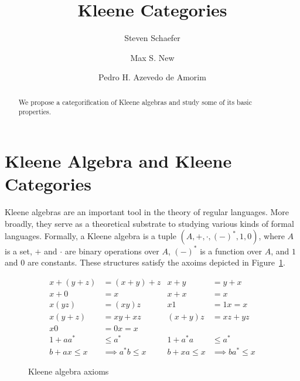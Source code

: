 \documentclass[acmsmall,anonymous,review,screen]{acmart}
\begin{document}
\title{Kleene Categories}
\author{Steven Schaefer}

\author{Max S. New}

\author{Pedro H. Azevedo de Amorim}

\begin{abstract}
  We propose a categorification of Kleene algebras and study some of its basic properties.
\end{abstract}

\maketitle


\section{Kleene Algebra and Kleene Categories}

Kleene algebras are an important tool in the theory of regular
languages. More broadly, they serve as a theoretical substrate to
studying various kinds of formal languages. Formally, a Kleene algebra is a tuple
$(A, +, \cdot, (-)^*, 1, 0)$, where $A$ is a set, $+$ and $\cdot$
are binary operations over $A$, $(-)^*$ is a function over $A$, and
$1$ and $0$ are constants. These structures satisfy the axoims depicted
in Figure~\ref{fig:axioms}.

\begin{figure}
  \begin{align*}
    x + (y + z) &= (x + y) + z & x + y &= y + x\\
    x + 0 &= x & x + x &= x\\
    x(yz) &= (xy)z & x1 &= 1x = x\\
    x(y + z) &= xy + xz & (x + y)z &= xz + yz\\
    x0 &= 0x = x & & \\
    1 + aa^* &\leq a^* & 1 + a^*a &\leq a^*\\
     b + ax \leq x &\implies a^*b \leq x &  b + xa \leq x &\implies ba^* \leq x
  \end{align*}
  \label{fig:axioms}
  \caption{Kleene algebra axioms}
\end{figure}
\end{document}
